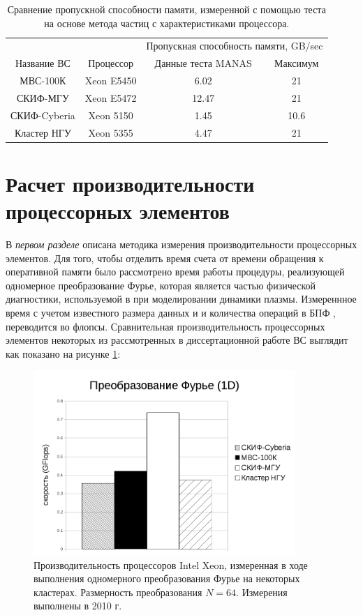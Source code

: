 \begin{table}[ht]
\caption{Сравнение пропускной способности памяти, измеренной с помощью теста на основе метода частиц с характеристиками процессора.}
\label{PIC_vs_PROC_RAM}
\begin{tabular}{|c|c|c|c|}
	\hline
             &            & \multicolumn{2}{|c|}{Пропускная способность памяти, GB/sec} \\ \cline{3-4}  	
Название ВС  & Процессор  & Данные теста MANAS & Максимум \\ \hline
МВС-100К     & Xeon E5450 &     6.02           & 21       \\ \hline 
СКИФ-МГУ     & Xeon E5472 &     12.47          & 21       \\ \hline     
СКИФ-Cyberia & Xeon 5150  &     1.45           & 10.6     \\ \hline
Кластер НГУ  & Xeon 5355  &     4.47           & 21       \\ \hline
\end{tabular}	
\end{table}

\section{Расчет производительности процессорных элементов}
\label{calc_PE}
В \textit{первом разделе} описана методика измерения производительности процессорных элементов.
Для того, чтобы отделить время счета от времени обращения к оперативной памяти было рассмотрено время работы процедуры,
реализующей одномерное преобразование Фурье, которая является частью физической диагностики, используемой в при моделировании динамики плазмы. Измереннное время с учетом известного размера данных и и количества операций в БПФ , переводится во флопсы. Сравнительная производительность процессорных элементов некоторых из рассмотренных в диссертационной работе ВС выглядит как показано на рисунке  \ref{procs_flops}:

\begin{figure}[htb]
	\begin{center}
		\includegraphics[height=7cm,keepaspectratio]{images/processor_FLOPS.png}
	\end{center}
	\caption{Производительность процессоров Intel Xeon, измеренная в ходе выполнения одномерного преобразования Фурье на некоторых кластерах. Размерность преобразования $N=64$. Измерения выполнены в 2010 г.}
	\label{procs_flops}
\end{figure} 


